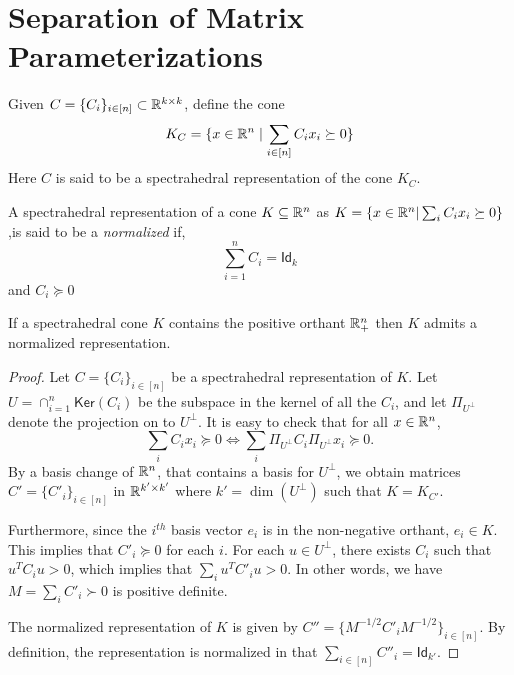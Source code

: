 \newcommand{\kernel}{\mathsf{Ker}}
\newcommand{\Id}{\mathsf{Id}}


\section{Separation of Matrix Parameterizations}

Given $C = \{C_i\}_{i \in [n]} \subset \mathbb{R}^{k \times k}$, define the cone 
\[ K_C = \{ x \in \mathbb{R}^n \mid \sum_{i \in [n]}  C_i x_i \succeq 0\}   \]
Here $C$ is said to be a spectrahedral representation of the cone $K_C$.

\begin{definition}
	A spectrahedral representation of a cone $K  \subseteq \mathbb{R}^n$ as $K = \{ x \in \mathbb{R}^n | \sum_i C_i x_i \succeq 0\}$,is said to be a {\it normalized} if,
    	\[ \sum_{i = 1}^n C_i = \Id_k \]
        and $C_i \succeq 0$
 \end{definition}
 
 \begin{lemma} \label{lem:normalization}
	If a spectrahedral cone $K$ contains the positive orthant $\mathbb{R}_{+}^n$ then $K$ admits a normalized representation.
 \end{lemma}

 \begin{proof}
Let $C = \{C_i\}_{i \in [n]}$ be a spectrahedral representation of $K$.
%
Let $U = \cap_{i = 1}^n \kernel(C_i)$ be the subspace in the kernel of all the $C_i$, and let $\Pi_{U^\perp}$ denote the projection on to $U^{\perp}$.  It is easy to check that for all $x \in \mathbb{R}^n$,
 \[ \sum_i C_i x_i \succeq 0 \iff \sum_i \Pi_{U^{\perp}} C_i \Pi_{U^{\perp}} x_i \succeq 0 .\]
 By a basis change of $\mathbb{R}^n$, that contains a basis for $U^{\perp}$, we obtain matrices $C' = \{C'_i\}_{i \in [n]}$ in $\mathbb{R}^{k' \times k'}$ where $k' = \dim(U^{\perp})$ such that $K = K_{C'}$.
 
Furthermore, since the $i^{th}$ basis vector $e_i$ is in the non-negative orthant, $e_i \in K$.  This implies that $C'_i \succeq 0$ for each $i$.  For each $u \in U^{\perp}$, there exists $C_i$ such that $u^T C_i u > 0$, which implies that 
$\sum_i u^T  C'_i u > 0$.  In other words, we have $M = \sum_i C'_i \succ 0$ is positive definite.

The normalized representation of $K$ is given by $C'' = \{ M^{-1/2}C'_i M^{-1/2}\}_{i \in [n]}$.  By definition, the representation is normalized in that $\sum_{i \in [n]} C''_i = \Id_{k'}$.
 \end{proof}
 
